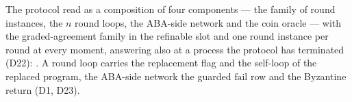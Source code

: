 \begin{definition}
  \label{def:aba-composed}
  \leanok
  The protocol read as a composition of four components --- the family of round instances, the $n$ round loops, the ABA-side network and the coin oracle --- with the graded-agreement family in the refinable slot and one round instance per round at every moment, answering also at a process the protocol has terminated (D22): .
  A round loop carries the replacement flag and the self-loop  of the replaced program, the ABA-side network the guarded $\mathrm{fail}$ row and the Byzantine return  (D1, D23).
\end{definition}
